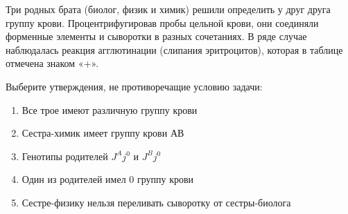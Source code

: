 
Три родных
брата (биолог, физик и химик) решили определить у друг друга группу крови.
Процентрифугировав пробы цельной крови, они соединяли форменные элементы и
сыворотки в разных сочетаниях. В ряде случае наблюдалась реакция агглютинации (слипания
эритроцитов), которая в таблице отмечена знаком «+».


Выберите утверждения, не противоречащие
условию задачи:

\begin{enumerate}
    \item Все трое имеют различную группу крови 
    \item Сестра-химик имеет группу крови АВ
    \item Генотипы родителей $J^Aj^0$ и $J^Bj^0$
    \item Один из родителей имел 0 группу крови
    \item Сестре-физику нельзя переливать сыворотку от сестры-биолога
\end{enumerate}

\explanationSection

